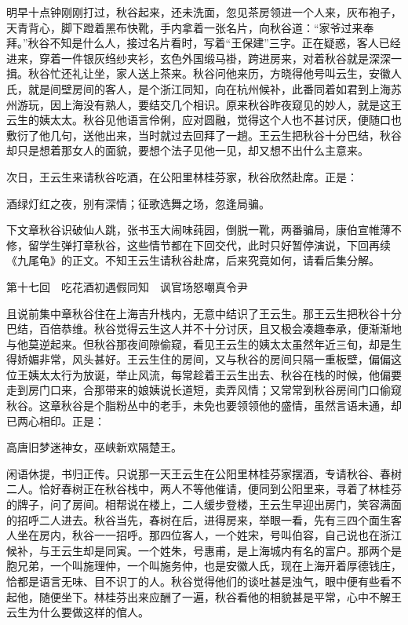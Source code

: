 \documentclass[12pt,UTF8]{ctexbook}
\begin{document}
{{{明早十点钟刚刚打过，秋谷起来，还未洗面，忽见茶房领进一个人来，灰布袍子，天青背心，脚下蹬着黑布快靴，手内拿着一张名片，向秋谷道：“家爷过来奉拜。”秋谷不知是什么人，接过名片看时，写着“王保建”三字。正在疑惑，客人已经进来，穿着一件银灰绉纱夹衫，玄色外国缎马褂，跨进房来，对着秋谷就是深深一揖。秋谷忙还礼让坐，家人送上茶来。秋谷问他来历，方晓得他号叫云生，安徽人氏，就是间壁房间的客人，是个浙江同知，向在杭州候补，此番同着如君到上海苏州游玩，因上海没有熟人，要结交几个相识。原来秋谷昨夜窥见的妙人，就是这王云生的姨太太。秋谷见他语言伶俐，应对圆融，觉得这个人也不甚讨厌，便随口也敷衍了他几句，送他出来，当时就过去回拜了一趟。王云生把秋谷十分巴结，秋谷却只是想着那女人的面貌，要想个法子见他一见，却又想不出什么主意来。

次日，王云生来请秋谷吃酒，在公阳里林桂芬家，秋谷欣然赴席。正是：

酒绿灯红之夜，别有深情；征歌选舞之场，忽逢局骗。

下文章秋谷识破仙人跳，张书玉大闹味莼园，倒脱一靴，两番骗局，康伯宣帷薄不修，留学生弹打章秋谷，这些情节都在下回交代，此时只好暂停演说，下回再续《九尾龟》的正文。不知王云生请秋谷赴席，后来究竟如何，请看后集分解。





第十七回　吃花酒初遇假同知　讽官场怒嘲真令尹





且说前集中章秋谷住在上海吉升栈内，无意中结识了王云生。那王云生把秋谷十分巴结，百倍恭维。秋谷觉得云生这人并不十分讨厌，且又极会凑趣奉承，便渐渐地与他莫逆起来。但秋谷那夜间隙偷窥，看见王云生的姨太太虽然年近三旬，却是生得娇媚非常，风头甚好。王云生住的房间，又与秋谷的房间只隔一重板壁，偏偏这位王姨太太行为放诞，举止风流，每常趁着王云生出去、秋谷在栈的时候，他偏要走到房门口来，合那带来的娘姨说长道短，卖弄风情；又常常到秋谷房间门口偷窥秋谷。这章秋谷是个脂粉丛中的老手，未免也要领领他的盛情，虽然言语未通，却已两心相印。正是：

高唐旧梦迷神女，巫峡新欢隔楚王。

闲语休提，书归正传。只说那一天王云生在公阳里林桂芬家摆酒，专请秋谷、春树二人。恰好春树正在秋谷栈中，两人不等他催请，便同到公阳里来，寻着了林桂芬的牌子，问了房间。相帮说在楼上，二人缓步登楼，王云生早迎出房门，笑容满面的招呼二人进去。秋谷当先，春树在后，进得房来，举眼一看，先有三四个面生客人坐在房内，秋谷一一招呼。那四位客人，一个姓宋，号叫伯容，自己说也在浙江候补，与王云生却是同寅。一个姓朱，号惠甫，是上海城内有名的富户。那两个是胞兄弟，一个叫施理仲，一个叫施务仲，也是安徽人氏，现在上海开着厚德钱庄，恰都是语言无味、目不识丁的人。秋谷觉得他们的谈吐甚是浊气，眼中便有些看不起他，随便坐下。林桂芬出来应酬了一遍，秋谷看他的相貌甚是平常，心中不解王云生为什么要做这样的倌人。

}}}
\end{document}

